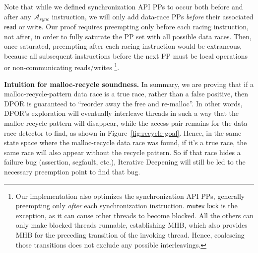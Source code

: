 Note that while we defined synchronization API PPs to occur both before and after any $\mathcal{A}_{sync}$ instruction,
we will only add data-race PPs {\em before} their associated $\mathsf{read}$ or $\mathsf{write}$.
Our proof requires preempting only before each racing instruction, not after,
in order to fully saturate the PP set with all possible data races.
Then, once saturated, preempting after each racing instruction would be extraneous,
because all subsequent instructions before the next PP must be local operations or non-communicating reads/writes%
%
\footnote{Our implementation also optimizes the synchronization API PPs,
generally preempting only {\em after} each synchronization instruction.
$\mathsf{mutex\_lock}$ is the exception, as it can cause other threads to become blocked.
All the others can only make blocked threads runnable, establishing MHB,
which also provides MHB for the preceding transition of the invoking thread.
Hence, coalescing those transitions does not exclude any possible interleavings.
}.

{\bf Intuition for malloc-recycle soundness.}
In summary, we are proving that if a malloc-recycle-pattern data race is a true race, rather than a false positive,
then DPOR is guaranteed to ``reorder away the free and re-malloc''.
In other words, DPOR's exploration will eventually interleave threads in such a way that the malloc-recycle pattern will disappear,
while the access pair remains for the data-race detector to find, as shown in Figure~\ref{fig:recycle-goal}.
Hence, in the same state space where the malloc-recycle data race was found, if it's a true race, the same race will also appear without the recycle pattern.
So if that race hides a failure bug (assertion, segfault, etc.), Iterative Deepening will still be led to the necessary preemption point to find that bug.

